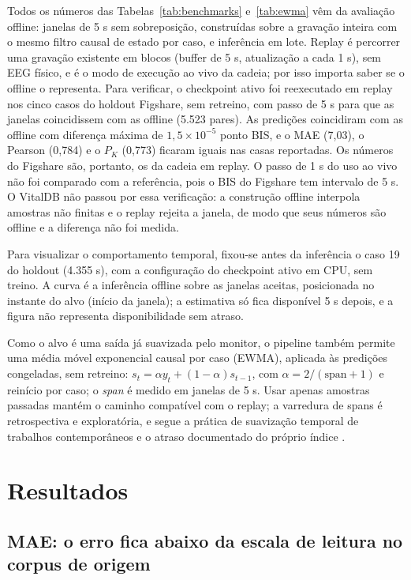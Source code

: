 \documentclass[12pt]{article}
\begin{document}
Todos os números das Tabelas~\ref{tab:benchmarks} e~\ref{tab:ewma} vêm da avaliação offline: janelas de 5 s sem sobreposição, construídas sobre a gravação inteira com o mesmo filtro causal de estado por caso, e inferência em lote. Replay é percorrer uma gravação existente em blocos (buffer de 5 s, atualização a cada 1 s), sem EEG físico, e é o modo de execução ao vivo da cadeia; por isso importa saber se o offline o representa. Para verificar, o checkpoint ativo foi reexecutado em replay nos cinco casos do holdout Figshare, sem retreino, com passo de 5 s para que as janelas coincidissem com as offline (5.523 pares). As predições coincidiram com as offline com diferença máxima de $1{,}5\times10^{-5}$ ponto BIS, e o MAE (7,03), o Pearson (0,784) e o $P_K$ (0,773) ficaram iguais nas casas reportadas. Os números do Figshare são, portanto, os da cadeia em replay. O passo de 1 s do uso ao vivo não foi comparado com a referência, pois o BIS do Figshare tem intervalo de 5 s. O VitalDB não passou por essa verificação: a construção offline interpola amostras não finitas e o replay rejeita a janela, de modo que seus números são offline e a diferença não foi medida.

Para visualizar o comportamento temporal, fixou-se antes da inferência o caso 19 do holdout (4.355 s), com a configuração do checkpoint ativo em CPU, sem treino. A curva é a inferência offline sobre as janelas aceitas, posicionada no instante do alvo (início da janela); a estimativa só fica disponível 5 s depois, e a figura não representa disponibilidade sem atraso.

Como o alvo é uma saída já suavizada pelo monitor, o pipeline também permite uma média móvel exponencial causal por caso (EWMA), aplicada às predições congeladas, sem retreino: $s_t = \alpha y_t + (1-\alpha)s_{t-1}$, com $\alpha = 2/(\mathrm{span}+1)$ e reinício por caso; o \textit{span} é medido em janelas de 5 s. Usar apenas amostras passadas mantém o caminho compatível com o replay; a varredura de spans é retrospectiva e exploratória, e segue a prática de suavização temporal de trabalhos contemporâneos \cite{sukriti2026} e o atraso documentado do próprio índice \cite{pilge2006}.

\section{Resultados}
\label{sec:resultados}

\subsection{MAE: o erro fica abaixo da escala de leitura no corpus de origem}
\label{sec:mae}
\end{document}
